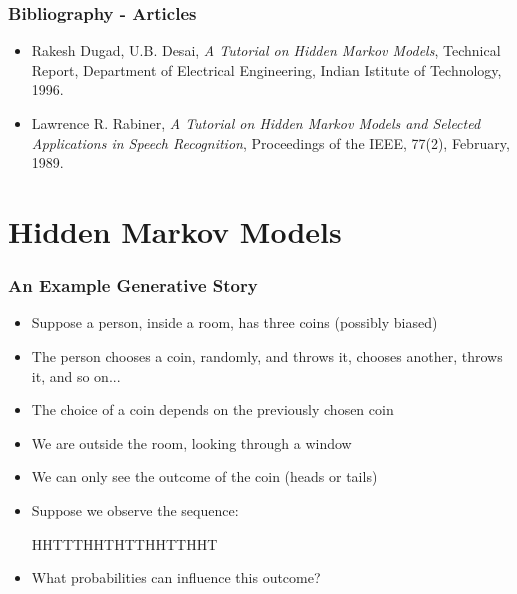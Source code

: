 \documentclass{beamer}
\subtitle{Information Extraction : Hidden Markov Models}
\begin{document}
\maketitle


\begin{frame} \frametitle{Bibliography - Articles}
  
  \begin{itemize}
  \item Rakesh Dugad, U.B. Desai, \textit{A Tutorial on Hidden Markov Models},
    Technical Report, Department of Electrical Engineering, Indian Istitute of
    Technology, 1996.
  \item Lawrence R. Rabiner, \textit{A Tutorial on Hidden Markov Models and
      Selected Applications in Speech Recognition}, Proceedings of the IEEE,
    77(2), February, 1989.
  \end{itemize}

\end{frame}


\section{Hidden Markov Models}

\begin{frame} \frametitle{An Example Generative Story}
  
  \begin{exampleblock}{}
    \begin{itemize}
    \item Suppose a person, inside a room, has three coins (possibly biased)
    \item The person chooses a coin, randomly, and throws it, chooses another,
        throws it, and so on...
    \item The choice of a coin depends on the previously chosen coin
    \item We are outside the room, looking through a window
    \item We can only see the outcome of the coin (heads or tails)
    \end{itemize}
  \end{exampleblock}

  \begin{itemize}
  \item Suppose we observe the sequence:
    \begin{center}
      HHTTTHHTHTTHHTTHHT
    \end{center}
  \item What probabilities can influence this outcome?
  \end{itemize}

\end{frame}
\end{document}
